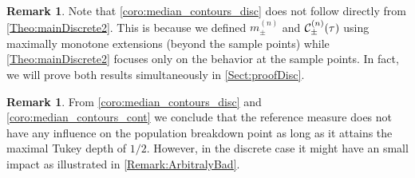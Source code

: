 \documentclass[11pt]{article}
\theoremstyle{plain}
\theoremstyle{definition}
\newtheorem{remark}[sectioncount]{Remark}
\begin{document}
\begin{remark}
    Note that \autoref{coro:median_contours_disc} does not follow directly from \autoref{Theo:mainDiscrete2}.%
     This is  because we defined $m_\pm^{(n)}$ and ${\cal  C}_\pm^{(n)}(\tau) $ using maximally monotone extensions (beyond the sample points) while \autoref{Theo:mainDiscrete2} focuses only on the behavior at the sample points.  { In fact, we will prove both results simultaneously in \autoref{Sect:proofDisc}.} 
\end{remark}
\begin{remark}\label{rem:reference_measure2}From \autoref{coro:median_contours_disc} and \autoref{coro:median_contours_cont} we conclude that the reference measure does not have any influence on the population breakdown point  as long as it attains the maximal Tukey depth of $1/2$. However, in the discrete case it might have an small impact as illustrated in  \autoref{Remark:ArbitralyBad}.
\end{remark}
\end{document}
